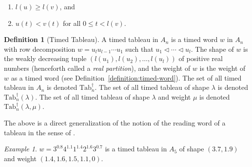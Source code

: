 \documentclass[10pt]{amsproc}
\theoremstyle{definition}
\newtheorem{definition}[theorem]{Definition}
\theoremstyle{remark}
\newtheorem{example}[theorem]{Example}
\newcommand{\ttab}{\mathrm{Tab}^\dagger}
\begin{document}
\begin{enumerate}
\item $l(u)\geq l(v)$, and
\item $u(t)<v(t)$ for all $0\leq t<l(v)$.
\end{enumerate}
\begin{definition}[Timed Tableau]\label{definition:timed-tableau}
  A timed tableau in $A_n$ is a timed word $w$ in $A_n$ with row decomposition $w=u_l u_{l-1}\dotsb u_1$ such that $u_1\lhd \dotsb \lhd u_l$.
  The shape of $w$ is the weakly decreasing tuple $(l(u_1),l(u_2),\dotsc,l(u_l))$ of positive real numbers (henceforth called a \emph{real partition}), and the weight of $w$ is the weight of $w$ as a timed word (see Definition~\ref{definition:timed-word}).
  The set of all timed tableau in $A_n$ is denoted $\ttab_n$.
  The set of all timed tableau of shape $\lambda$ is denoted $\ttab_n(\lambda)$.
  The set of all timed tableau of shape $\lambda$ and weight $\mu$ is denoted $\ttab_n(\lambda,\mu)$.
\end{definition}
The above is a direct generalization of the notion of the reading word of a tableau in the sense of \cite{Lascoux}.
\begin{example}
  \label{example:timed-tableau}
  $w=3^{0.8}4^{1.1}1^{1.4}2^{1.6}3^{0.7}$ is a timed tableau in $A_5$ of shape $(3.7,1.9)$ and weight $(1.4, 1.6, 1.5, 1.1,0)$.
\end{example}
\end{document}
